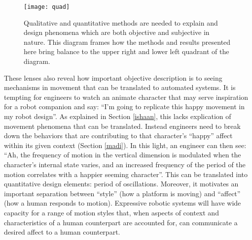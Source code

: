 \documentclass[arts,article,submit,moreauthors,pdftex,10pt,a4paper]{mdpi}
\begin{document}
\begin{figure}[h!]
\centering
\vspace{-.1in}
\texttt{[image: quad]}
\caption{Qualitative and quantitative methods are needed to explain and design phenomena which are both objective and subjective in nature.  This diagram frames how the methods and results presented here bring balance to the upper right and lower left quadrant of the diagram.}
\label{quad}
\end{figure}

These lenses also reveal how important objective description is to seeing mechanisms in movement that can be translated to automated systems.  It is tempting for engineers to watch an animate character that may serve inspiration for a robot companion and say: ``I'm going to replicate this happy movement in my robot design''.  As explained in Section \ref{ishaan}, this lacks explication of movement phenomena that can be translated.  Instead engineers need to break down the behaviors that are contributing to that character's ``happy'' affect within its given context (Section \ref{madi}).  In this light, an engineer can then see: ``Ah, the frequency of motion in the vertical dimension is modulated when the character's internal state varies, and an increased frequency of the period of the motion correlates with a happier seeming character''.  This can be translated into quantitative design elements:  period of oscillations.  Moreover, it motivates an important separation between ``style'' (how a platform is moving) and ``affect'' (how a human responds to motion).  Expressive robotic systems will have wide capacity for a range of motion styles that, when aspects of context and characteristics of a human counterpart are accounted for, can communicate a desired affect to a human counterpart.

%

\end{document}
